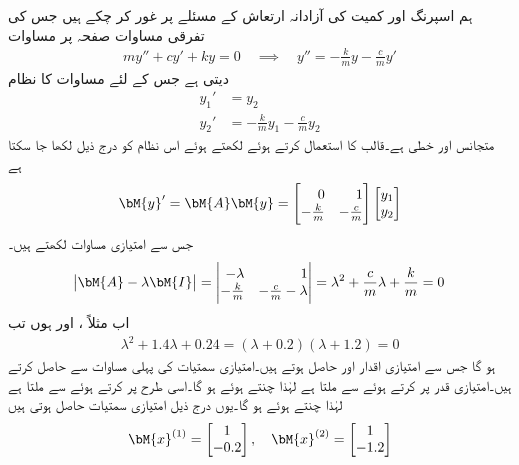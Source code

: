 ہم  اسپرنگ اور کمیت کی آزادانہ ارتعاش  کے مسئلے پر غور کر چکے ہیں جس کی تفرقی مساوات صفحہ  پر مساوات 
\begin{align}
my''+cy'+ky=0 \quad \implies \quad y''=-\frac{k}{m}y-\frac{c}{m}y'
\end{align}
 دیتی ہے جس کے لئے مساوات  کا نظام
\begin{align*}
y_1'&=y_2\\
y_2'&=-\frac{k}{m}y_1-\frac{c}{m}y_2
\end{align*}
 متجانس اور خطی ہے۔قالب کا استعمال کرتے ہوئے  لکھتے ہوئے اس نظام کو درج ذیل لکھا جا سکتا ہے
\begin{align}
\bM{y}'=\bM{A}\bM{y}=\begin{bmatrix*}[r] 0 & 1 \\ -\frac{k}{m}& -\frac{c}{m} \end{bmatrix*}\begin{bmatrix*}[r]  y_1 \\ y_2 \end{bmatrix*}
\end{align}
جس سے امتیازی مساوات لکھتے ہیں۔
\begin{align*}
\abs{\bM{A}-\lambda \bM{I}}=\begin{vmatrix*}[r] -\lambda & 1\\ -\frac{k}{m}& -\frac{c}{m}-\lambda \end{vmatrix*}=\lambda^2+\frac{c}{m}\lambda+\frac{k}{m}=0
\end{align*}
اب مثلاً ،  اور  ہوں تب 
\begin{align*}
\lambda^2+1.4\lambda+0.24=(\lambda+0.2)(\lambda+1.2)=0
\end{align*}
ہو گا جس سے امتیازی اقدار  اور  حاصل ہوتے ہیں۔امتیازی سمتیات  کی پہلی مساوات  سے حاصل کرتے ہیں۔امتیازی قدر  پر کرتے ہوئے   سے  ملتا ہے لہٰذا  چنتے ہوئے  ہو گا۔اسی طرح  پر کرتے ہوئے  سے  ملتا ہے لہٰذا  چنتے ہوئے  ہو گا۔یوں درج ذیل امتیازی سمتیات حاصل ہوتی ہیں
\begin{align*}
\bM{x}^{(1)}=\begin{bmatrix*} 1 \\ -0.2  \end{bmatrix*}, \quad \bM{x}^{(2)}=\begin{bmatrix*}  1 \\ -1.2 \end{bmatrix*}
\end{align*}
